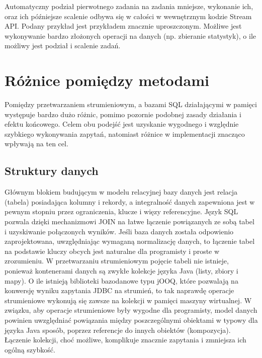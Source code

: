 \documentclass[12pt]{extarticle}
\begin{document}
    Automatyczny podział pierwotnego zadania na zadania mniejsze, wykonanie ich, oraz ich późniejsze scalenie odbywa się w całości w wewnętrznym kodzie Stream API. Podany przykład jest przykładem znacznie uproszczonym. Możliwe jest wykonywanie bardzo złożonych operacji na danych (np. zbieranie statystyk), o ile możliwy jest podział i scalenie zadań.

\section{Różnice pomiędzy metodami}

    Pomiędzy przetwarzaniem strumieniowym, a bazami SQL działającymi w pamięci występuje bardzo dużo różnic, pomimo pozornie podobnej zasady działania i efektu końcowego. Celem obu podejść jest uzyskanie wygodnego i względnie szybkiego wykonywania zapytań, natomiast różnice w implementacji znacząco wpływają na ten cel.

\subsection{Struktury danych}

    Głównym blokiem budującym w modelu relacyjnej bazy danych jest relacja (tabela) posiadająca kolumny i rekordy, a integralność danych zapewniona jest w pewnym stopniu przez ograniczenia, klucze i więzy referencyjne. Język SQL pozwala dzięki mechanizmowi JOIN na łatwe łączenie powiązanych ze sobą tabel i uzyskiwanie połączonych wyników. Jeśli baza danych została odpowienio zaprojektowana, uwzględniając wymaganą normalizację danych, to łączenie tabel na podstawie kluczy obcych jest naturalne dla programisty i proste w zrozumieniu. W przetwarzaniu strumieniowym pojęcie tabeli nie istnieje, ponieważ kontenerami danych są zwykłe kolekcje języka Java (listy, zbiory i mapy). O ile istnieją biblioteki bazodanowe typu jOOQ, które pozwalają na konwersję wyniku zapytania JDBC na strumień, to tak naprawdę operacje strumieniowe wykonują się zawsze na kolekcji w pamięci maszyny wirtualnej. W związku, aby operacje strumieniowe były wygodne dla programisty, model danych powinien uwzględniać powiązania między poszczególnymi obiektami w typowy dla języka Java sposób, poprzez referencje do innych obiektów (kompozycja). Łączenie kolekcji, choć możliwe, komplikuje znacznie zapytania i zmniejsza ich ogólną szybkość.
\end{document}
